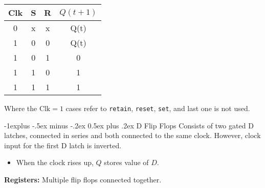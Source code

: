 \documentclass[11pt,landscape]{article}
\makeatletter
\renewcommand{\subsection}{\@startsection{subsection}{2}{0mm}%
                                {-1explus -.5ex minus -.2ex}%
                                {0.5ex plus .2ex}%
                                {\normalfont\normalsize\bfseries}}
\makeatother
\begin{document}
\begin{multicols}{3}
{\begin{multicols}{2}
\begin{center}
        \end{center}


        \begin{center}
            \begin{tabular}{c|c|c|c}
                Clk & S & R & $Q(t+1)$ \\ \hline
                0 & x & x & Q(t) \\
                1 & 0 & 0 & Q(t) \\ 
                1 & 0 & 1 & 0 \\ 
                1 & 1 & 0 & 1 \\ 
                1 & 1 & 1 & 1
           \end{tabular}
        \end{center}
        \vspace{-3mm}
        \scriptsize Where the $\text{Clk}=1$ cases refer to \verb!retain!, \verb!reset!, \verb!set!, and last one is not used.
    \end{multicols}
}

\subsection{D Flip Flops}
Consists of two gated D latches, connected in series and both connected to the same clock. However, clock input for the first D latch is inverted.
\begin{itemize}
    \item When the clock rises up, $Q$ stores value of $D$.
\end{itemize}
\textbf{Registers:} Multiple flip flops connected together.
\end{multicols}
\end{document}
